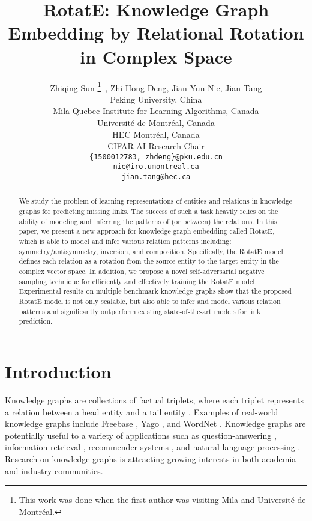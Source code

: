 \documentclass{article} \usepackage{iclr2019_conference,times}
\title{RotatE: Knowledge Graph Embedding by Relational Rotation in Complex Space}
\author{
Zhiqing Sun \thanks{This work was done when the first author was visiting Mila and Universit\'e de Montr\'eal.}\ , Zhi-Hong Deng, Jian-Yun Nie, Jian Tang\\
Peking University, China\\
Mila-Quebec Institute for Learning Algorithms, Canada\\
Universit\'e de Montr\'eal, Canada\\
HEC Montr\'eal, Canada\\
CIFAR AI Research Chair\\
\texttt{\{1500012783, zhdeng\}@pku.edu.cn}\\
\texttt{nie@iro.umontreal.ca}\\
\texttt{jian.tang@hec.ca}
}
\begin{document}
\maketitle

\begin{abstract}
We study the problem of learning representations of entities and relations in knowledge graphs for predicting missing links. The success of such a task heavily relies on the ability of modeling and inferring the patterns of (or between) the relations. In this paper, we present a new approach for knowledge graph embedding called RotatE, which is able to model and infer various relation patterns including: symmetry/antisymmetry, inversion, and composition.
Specifically, the RotatE model defines each relation as a rotation from the source entity to the target entity in the complex vector space. In addition, we propose a novel self-adversarial negative sampling technique for efficiently and effectively training the RotatE model. Experimental results on multiple benchmark knowledge graphs show that the proposed RotatE model is not only scalable, but also able to infer and model various relation patterns and significantly outperform existing state-of-the-art models for link prediction.
\end{abstract}

\section{Introduction}

Knowledge graphs are collections of factual triplets, where each triplet  represents a relation  between a head entity  and a tail entity . Examples of real-world knowledge graphs include Freebase \citep{bollacker2008freebase}, Yago \citep{suchanek2007yago}, and WordNet \citep{miller1995wordnet}. Knowledge graphs are potentially useful to a variety of applications such as question-answering \citep{hao2017end}, information retrieval \citep{xiong2017explicit}, recommender systems \citep{zhang2016collaborative}, and natural language processing \citep{yang2017leveraging}. Research on knowledge graphs is attracting growing interests in both academia and industry communities. 
\end{document}
